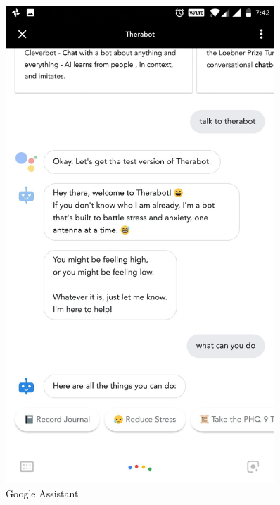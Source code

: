 \begin{figure}[H]
\begin{minipage}{0.45\textwidth}
        \includegraphics[width=0.9\textwidth]{images/screenshots/chatbot/6.jpg}
        \caption{Google Assistant}
    \end{minipage}
\end{figure}
\vspace*{\fill}

\pagebreak

